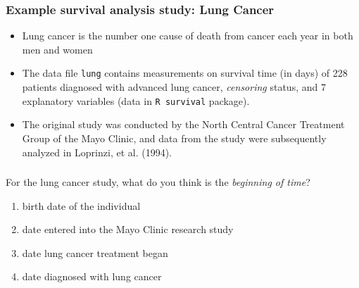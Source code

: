 \begin{frame}
\frametitle{Example survival analysis study: Lung Cancer}
\begin{itemize}
\item Lung cancer is the number one cause of death from cancer each year in both men and women
\item The data file \texttt{lung} contains measurements on survival time (in days) of 228 patients diagnosed with advanced lung cancer, \textit{censoring} status, and 7 explanatory variables (data in \texttt{R survival} package).
\item The original study was conducted by the North Central Cancer Treatment Group of the Mayo Clinic, and data from the study were subsequently
analyzed in Loprinzi, et al. (1994).
\end{itemize}
\end{frame}

\begin{frame}
\frametitle{\grp}
\begin{clicker}{For the lung cancer study, what do you think is the \emph{beginning of time}?}
\begin{enumerate}
\item birth date of the individual
\item date entered into the Mayo Clinic research study
\item date lung cancer treatment began
\item date diagnosed with lung cancer %
\end{enumerate}
\end{clicker}
\end{frame}


